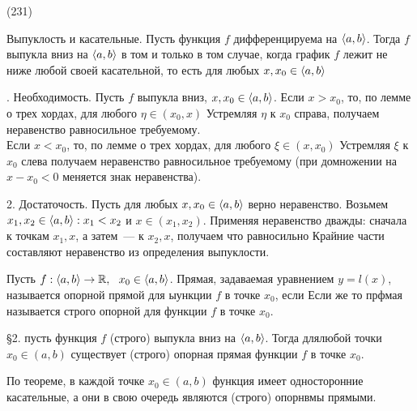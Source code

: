 (231)

\T \q Выпуклость и касательные. Пусть функция $f$ дифференцируема на $\langle a, b \rangle$. Тогда $f$ выпукла вниз на $\langle a, b \rangle$ в том и только в том случае, когда график $f$ лежит не ниже любой своей касательной, то есть для любых $x, x_0 \in \langle a, b \rangle$ 

. Необходимость. Пусть $f$ выпукла вниз, $x, x_0 \in \langle a, b \rangle$. Если $x > x_0$, то, по лемме о трех хордах, для любого $\eta \in (x_0, x)$  Устремляя $\eta$ к $x_0$ справа, получаем неравенство  равносильное требуемому.\\
Если $x < x_0$, то, по лемме о трех хордах, для любого $\xi \in (x, x_0)$  Устремляя $\xi$ к $x_0$ слева получаем неравенство  равносильное требуемому (при домножении на $x - x_0 < 0$ меняется знак неравенства).

2. Достаточость. Пусть для любых $x, x_0 \in \langle a, b \rangle$ верно неравенство. Возьмем $x_1, x_2 \in \langle a, b \rangle: x_1 < x_2$ и $x \in (x_1, x_2)$. Применяя неравенство дважды: сначала к точкам $x_1, x$, а затем~--- к $x_2, x$, получаем  что равносильно  Крайние части составляют неравенство из определения выпуклости.

\Op Пусть $f: \langle a, b \rangle\to \mathbb{R},\ \  x_0 \in \langle a, b \rangle$. Прямая, задаваемая уравнением $y = l(x)$, называется опорной прямой для ыункции $f$ в точке $x_0$, если  Если же  то прфмая называется строго опорной для функции $f$ в точке $x_0$.

\S2. пусть функция $f$ (строго) выпукла вниз на $\langle a, b \rangle$. Тогда длялюбой точки $x_0 \in (a, b)$ существует (строго) опорная прямая функции $f$ в точке $x_0$.

\D По теореме, в каждой точке $x_0 \in (a, b)$ функция имеет односторонние касательные, а они в свою очередь являются (строго) опорнвмы прямыми.